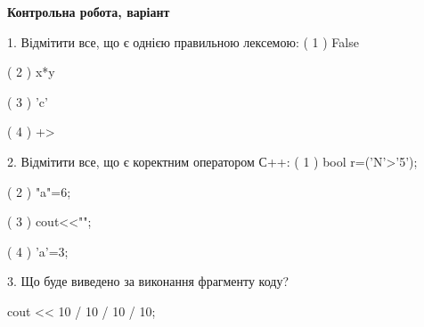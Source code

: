 \documentclass[11pt, ukrainian]{article}
\begin{document}
\vspace{20mm}
\begin{large}
\textbf{Контрольна робота, варіант }\par

1. Відмітити все, що є однією правильною лексемою:
( 1 ) False

( 2 ) x*y

( 3 ) 'c'

( 4 ) +>


2. Відмітити все, що є коректним оператором С++:
( 1 ) bool r=('N'>'5');

( 2 ) "a"=6;

( 3 ) cout<<"\n";

( 4 ) 'a'=3;


3. Що буде виведено за виконання фрагменту коду?

cout << 10 / 10 / 10 / 10;

\end{large}
\newpage
\end{document}
